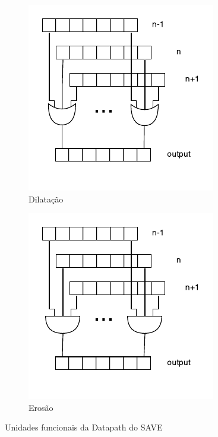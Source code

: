 \documentclass[a4paper]{article}
\begin{document}
\begin{figure}[h]
	\centering
	\begin{subfigure}[b]{0.45\textwidth}
		\centering
		\includegraphics[width=\linewidth]{SAVE_datapath_D}
		\caption{Dilatação}
		\label{fig:SAVE_datapath_D}
	\end{subfigure}
	\begin{subfigure}[b]{0.45\textwidth}
		\centering
		\includegraphics[width=\linewidth]{SAVE_datapath_E}
		\caption{Erosão}
		\label{fig:SAVE_datapath_E}
	\end{subfigure}
	\caption{Unidades funcionais da Datapath do SAVE}
	\label{fig:SAVE_datapath_E_D}
\end{figure}
\end{document}
